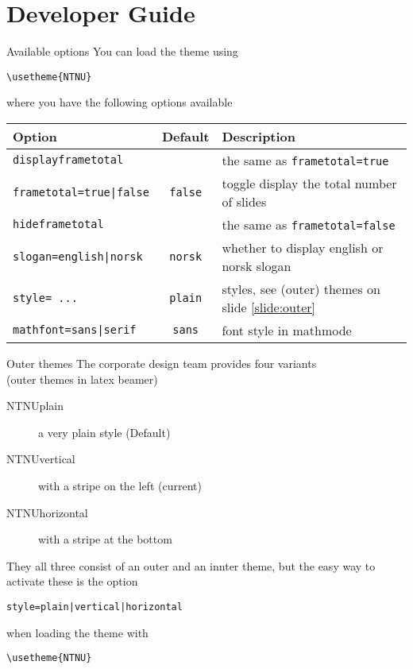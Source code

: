 \documentclass[aspectratio=169]{beamer}
\begin{document}
	\section{Developer Guide}
		\begin{frame}[fragile]{Available options}
			\label{slide:developer}
			You can load the theme using

			\lstinline!\usetheme{NTNU}!

			where you have the following options available

			\begin{tabular}{lcl}
				\toprule
				\textbf{Option} & \textbf{Default} &\textbf{Description} \\
				\midrule
				\lstinline!displayframetotal! && the same as \lstinline!frametotal=true! \\
				\lstinline!frametotal=true|false! & \lstinline!false! & toggle display the total number of slides\\
				\lstinline!hideframetotal! && the same as \lstinline!frametotal=false! \\
				\lstinline!slogan=english|norsk! & \lstinline!norsk! & whether to display english or norsk slogan\\
				\lstinline!style= ...! & \lstinline!plain! & styles, see (outer) themes on slide \ref{slide:outer}\\
				\lstinline!mathfont=sans|serif! & \lstinline!sans! & font style in mathmode\\
				\bottomrule
			\end{tabular}
		\end{frame}
		\begin{frame}[fragile]{Outer themes}
			\label{slide:outer}
			The corporate design team provides four variants
			\\\hfill{\small (outer themes in latex beamer)}

			\begin{description}
				\item[NTNUplain] a very plain style (Default)
				\item[NTNUvertical] with a stripe on the left (current)
				\item[NTNUhorizontal] with a stripe at the bottom
			\end{description}

			They all three consist of an outer and an innter theme, but the easy way to activate these is the option

			\lstinline!style=plain|vertical|horizontal!

			when loading the theme with

			\lstinline!\usetheme{NTNU}!
		\end{frame}
\end{document}
